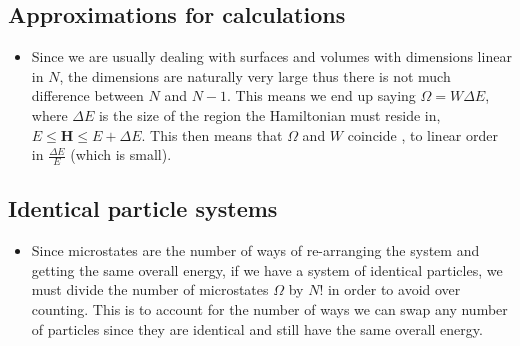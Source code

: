 \documentclass[11pt]{article}
\numberwithin{equation}{section}
\numberwithin{equation}{section}
\begin{document}
\subsection{Approximations for calculations}
\begin{itemize}
    \item Since we are usually dealing with surfaces and volumes with dimensions linear in $N$, the dimensions are naturally very large thus there is not much difference between $N$ and $N-1$. This means we end up saying $\Omega = W \Delta E$, where $\Delta E$ is the size of the region the Hamiltonian must reside in, $E \leq \mathbf{H} \leq E + \Delta E$.  This then means that $\Omega $ and $W$ coincide , to linear order in $\frac{\Delta E}{E}$ (which is small). 



\end{itemize}




\subsection{Identical particle systems}
\begin{itemize}
    \item Since microstates are the number of ways of re-arranging the system and getting the same overall energy, if we have a system of identical particles, we must divide the number of microstates $\Omega$ by $N!$ in order to avoid over counting. This is to account for the number of ways we can swap any number of particles since they are identical and still have the same overall energy. 
\end{itemize}
\end{document}
